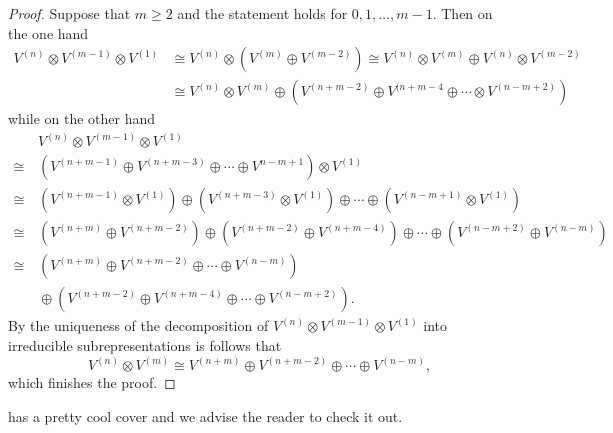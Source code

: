 \begin{proof}
 Suppose that $m \geq 2$ and the statement holds for $0, 1, \dotsc, m-1$. Then on the one hand
 \begin{align*}
  V^{(n)} \otimes V^{(m-1)} \otimes V^{(1)}
  &\cong V^{(n)} \otimes \left( V^{(m)} \oplus V^{(m-2)} \right)
  \cong V^{(n)} \otimes V^{(m)} \oplus V^{(n)} \otimes V^{(m-2)} \\
  &\cong V^{(n)} \otimes V^{(m)} \oplus \left( V^{(n+m-2)} \oplus V^{(n+m-4} \oplus \dotsb \otimes V^{(n-m+2)} \right)
 \end{align*}
 while on the other hand
 \begin{align*}
       &\, V^{(n)} \otimes V^{(m-1)} \otimes V^{(1)} \\
  \cong&\, \left( V^{(n+m-1)} \oplus V^{(n+m-3)} \oplus \dotsb \oplus V^{n-m+1} \right) \otimes V^{(1)} \\
  \cong&\, \left( V^{(n+m-1)} \otimes V^{(1)} \right)
           \oplus \left( V^{(n+m-3)} \otimes V^{(1)} \right)
           \oplus \dotsb
           \oplus \left( V^{(n-m+1)} \otimes V^{(1)} \right) \\
  \cong&\, \left( V^{(n+m)} \oplus V^{(n+m-2)} \right)
           \oplus \left( V^{(n+m-2)} \oplus V^{(n+m-4)} \right)
           \oplus \dotsb
           \oplus \left( V^{(n-m+2)} \oplus V^{(n-m)} \right) \\
  \cong&\, \left( V^{(n+m)} \oplus V^{(n+m-2)} \oplus \dotsb \oplus V^{(n-m)} \right) \\
       &\,  \oplus \left( V^{(n+m-2)} \oplus V^{(n+m-4)} \oplus \dotsb \oplus V^{(n-m+2)} \right).
 \end{align*}
 By the uniqueness of the decomposition of $V^{(n)} \otimes V^{(m-1)} \otimes V^{(1)}$ into irreducible subrepresentations is follows that
 \[
  V^{(n)} \otimes V^{(m)} \cong V^{(n+m)} \oplus V^{(n+m-2)} \oplus \dotsb \oplus V^{(n-m)},
 \]
 which finishes the proof.
\end{proof}


\begin{rem}
 \cite{Lectures_on_sl2_modules} has a pretty cool cover and we advise the reader to check it out.
\end{rem}























